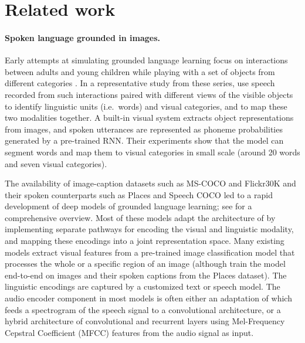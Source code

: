 \section{Related work}
\label{sec:related}

\paragraph{Spoken language grounded in images.}
Early attempts at simulating grounded language learning focus on
interactions between adults and young children while playing with a
set of objects from different categories \cite{roy1999learning,
  roy2000grounded, roy2000learning, roy2002learning,
  gorniak2003visually, mukherjee2003visual}. In a representative study
from these series, \citet{roy2002learning} use speech recorded from
such interactions paired with different views of the visible objects
to identify linguistic units (i.e.\ words) and visual categories, and
to map these two modalities together. A built-in visual system
extracts object representations from images, and spoken utterances are
represented as phoneme probabilities generated by a pre-trained
RNN. Their experiments show that the model can segment words and map
them to visual categories in small scale (around 20 words and seven
visual categories).

The availability of image-caption datasets such as MS-COCO
\cite{lin2014microsoft} and Flickr30K \cite{plummer2015flickr30k} and
their spoken counterparts such as Places \cite{zhou2014learning} and
Speech COCO \cite{speech_coco} led to a rapid development of deep
models of grounded language learning; see
\citet{chrupala-visually-2021} for a comprehensive overview. Most of
these models adapt the architecture of \citet{karpathy2014deep} by
implementing separate pathways for encoding the visual and linguistic
modality, and mapping these encodings into a joint representation
space. Many existing models extract visual features from a pre-trained
image classification model that processes the whole or a specific
region of an image (although \citet{harwath2018jointly} train the
model end-to-end on images and their spoken captions from the Places
dataset). The linguistic encodings are captured by a customized text
or speech model.  The audio encoder component in most models is often
either an adaptation of \citet{harwath2016unsupervised} which feeds a
spectrogram of the speech signal to a convolutional architecture, or a
hybrid architecture of convolutional and recurrent layers using
Mel-Frequency Cepstral Coefficient (MFCC) features from the audio
signal as input.

